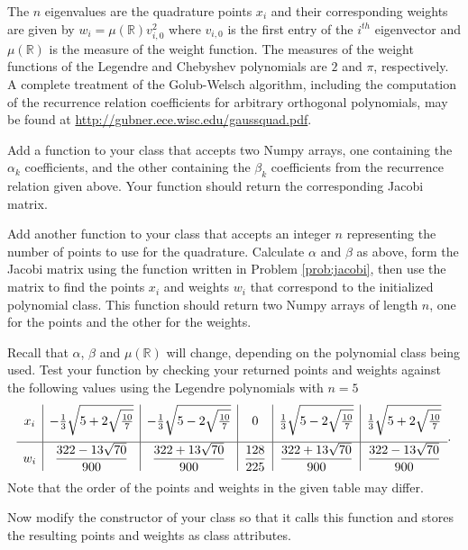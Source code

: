 The $n$ eigenvalues are the quadrature points $x_i$ and their corresponding weights are given by $w_i=\mu(\mathbb{R})v_{i,0}^2$ where $v_{i,0}$ is the first entry of the $i^{th}$ eigenvector and 
$\mu(\mathbb{R})$ is the measure of the weight function.
The measures of the weight functions of the Legendre and Chebyshev polynomials are $2$ and $\pi$, respectively.
A complete treatment of the Golub-Welsch algorithm, including the computation of the recurrence relation coefficients for arbitrary orthogonal polynomials, may be found 
at \url{http://gubner.ece.wisc.edu/gaussquad.pdf}.

\begin{problem} %
\label{prob:jacobi}
Add a function to your class that accepts two Numpy arrays, one containing the $\alpha_k$ coefficients, and the other containing the $\beta_k$ coefficients from the recurrence relation given above.
Your function should return the corresponding Jacobi matrix.
\end{problem}

\begin{problem} %
Add another function to your class that accepts an integer $n$ representing the number of points to use for the quadrature.
Calculate $\alpha$ and $\beta$ as above, form the Jacobi matrix using the function written in Problem \ref{prob:jacobi}, then use the matrix to find the points $x_i$ and weights $w_i$ that 
correspond to the initialized polynomial class.
This function should return two Numpy arrays of length $n$, one for the points and the other for the weights.

Recall that $\alpha$, $\beta$ and $\mu(\mathbb{R})$ will change, depending on the polynomial class being used.
Test your function by checking your returned points and weights against the following values using the Legendre polynomials with $n=5$
\[
\centering %
\begin{array}{c|c|c|c|c|c}
    x_i
    & -\frac{1}{3}\sqrt{5 + 2\sqrt{\frac{10}{7}}}
    & -\frac{1}{3}\sqrt{5 - 2\sqrt{\frac{10}{7}}}
    & 0
    & \frac{1}{3}\sqrt{5 - 2\sqrt{\frac{10}{7}}}
    & \frac{1}{3}\sqrt{5 + 2\sqrt{\frac{10}{7}}}
    \\[1em] \hline
    w_i
    & \dfrac{322-13\sqrt{70}}{900}
    & \dfrac{322+13\sqrt{70}}{900}
    & \dfrac{128}{225}
    & \dfrac{322+13\sqrt{70}}{900}
    & \dfrac{322-13\sqrt{70}}{900}
\end{array}.
\]
Note that the order of the points and weights in the given table may differ.

Now modify the constructor of your class so that it calls this function and stores the resulting points and weights as class attributes.
\end{problem}



